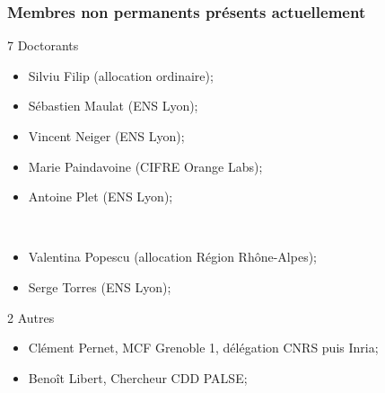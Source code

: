 \documentclass[mathsans]{beamer}
\begin{document}
\begin{frame}
\frametitle{Membres non permanents présents actuellement}
\begin{small}
\begin{minipage}{6cm}
\alert{7 Doctorants}
\begin{itemize}
\item Silviu Filip (allocation ordinaire);
\item Sébastien Maulat (ENS Lyon);
\item Vincent Neiger (ENS Lyon);
\item Marie Paindavoine (CIFRE Orange Labs);
\item Antoine Plet (ENS Lyon);
\end{itemize}
\end{minipage}~
\begin{minipage}{6cm}
\begin{itemize}
\item Valentina Popescu (allocation Région Rhône-Alpes);
\item Serge Torres (ENS Lyon);
\end{itemize}

\alert{2 Autres}
\begin{itemize}
    \item Clément Pernet, MCF Grenoble 1, délégation CNRS puis Inria; 
    \item Benoît Libert, Chercheur CDD PALSE;
\end{itemize}
\end{minipage}
\end{small}
\end{frame}
\end{document}
